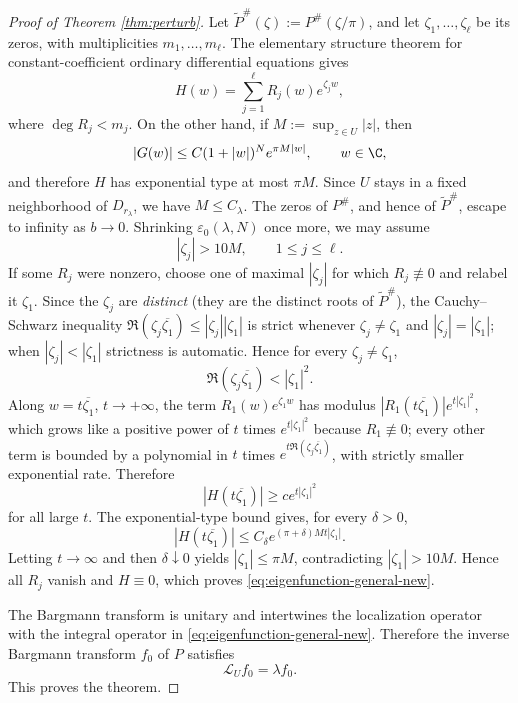 \begin{proof}[Proof of Theorem \ref{thm:perturb}]
Let \(\widetilde P^\#(\zeta):=P^\#(\zeta/\pi)\), and let
\(\zeta_1,\ldots,\zeta_\ell\) be its zeros, with multiplicities
\(m_1,\ldots,m_\ell\). The elementary structure theorem for
constant-coefficient ordinary differential equations gives
\[
H(w)=\sum_{j=1}^\ell R_j(w)e^{\zeta_j w},
\]
where \(\deg R_j<m_j\). On the other hand, if
\(M:=\sup_{z\in U}|z|\), then
\[
|G(w)|\le C(1+|w|)^N e^{\pi M|w|},
\qquad w\in\C,
\]
and therefore \(H\) has exponential type at most \(\pi M\).
Since \(U\) stays in a fixed neighborhood of \(D_{r_\lambda}\), we have
\(M\le C_\lambda\). The zeros of \(P^\#\), and hence of
\(\widetilde P^\#\), escape to infinity as \(b\to0\). Shrinking
\(\varepsilon_0(\lambda,N)\) once more, we may assume
\[
|\zeta_j|>10M,\qquad 1\le j\le \ell .
\]
If some \(R_j\) were nonzero, choose one of maximal \(|\zeta_j|\) for which
\(R_j\not\equiv0\) and relabel it \(\zeta_1\). Since the \(\zeta_j\) are
\emph{distinct} (they are the distinct roots of \(\widetilde P^\#\)),
the Cauchy--Schwarz inequality
\(\Re(\zeta_j\overline{\zeta_1})\le|\zeta_j||\zeta_1|\) is strict whenever
\(\zeta_j\ne\zeta_1\) and \(|\zeta_j|=|\zeta_1|\); when \(|\zeta_j|<|\zeta_1|\)
strictness is automatic. Hence for every \(\zeta_j\ne\zeta_1\),
\[
\Re(\zeta_j\overline{\zeta_1})<|\zeta_1|^2 .
\]
Along \(w=t\overline{\zeta_1}\), \(t\to+\infty\), the term
\(R_1(w)e^{\zeta_1w}\) has modulus \(|R_1(t\overline{\zeta_1})|e^{t|\zeta_1|^2}\),
which grows like a positive power of \(t\) times \(e^{t|\zeta_1|^2}\)
because \(R_1\not\equiv0\); every other term is bounded by a polynomial
in \(t\) times \(e^{t\Re(\zeta_j\overline{\zeta_1})}\), with strictly smaller
exponential rate. Therefore
\[
|H(t\overline{\zeta_1})|\ge c e^{t|\zeta_1|^2}
\]
for all large \(t\). The exponential-type bound gives, for every
\(\delta>0\),
\[
|H(t\overline{\zeta_1})|
\le C_\delta e^{(\pi+\delta)Mt|\zeta_1|}.
\]
Letting \(t\to\infty\) and then \(\delta\downarrow0\) yields
\(|\zeta_1|\le \pi M\), contradicting \(|\zeta_1|>10M\). Hence all
\(R_j\) vanish and \(H\equiv0\), which proves
\eqref{eq:eigenfunction-general-new}.

The Bargmann transform is unitary and intertwines the localization operator
with the integral operator in \eqref{eq:eigenfunction-general-new}. Therefore
the inverse Bargmann transform \(f_0\) of \(P\) satisfies
\[
\mathcal L_U f_0=\lambda f_0 .
\]
This proves the theorem.
\end{proof}


